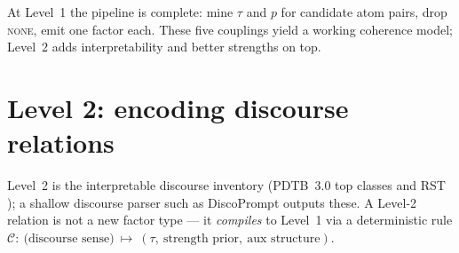 \documentclass[11pt]{article}
\begin{document}
At Level~1 the pipeline is complete: mine $\tau$ and $p$ for candidate atom pairs, drop
\textsc{none}, emit one factor each. These five couplings yield a working coherence model;
Level~2 adds interpretability and better strengths on top.

\section{Level 2: encoding discourse relations}
\label{sec:level2}

Level~2 is the interpretable discourse inventory (PDTB~3.0 top classes \citep{pdtb3} and
RST \citep{rst}); a shallow discourse parser such as DiscoPrompt \citep{discoprompt} outputs
these. A Level-2 relation is not a new factor type --- it \emph{compiles} to Level~1 via a
deterministic rule
\(
  \mathcal C:\ \text{(discourse sense)}\ \mapsto\ (\tau,\ \text{strength prior},\ \text{aux structure}).
\)
\end{document}
